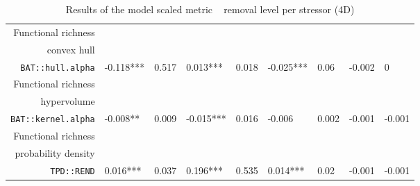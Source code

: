 \begin{table}[ht]
\begin{tabular}{rllllllll}
  Functional richness\\convex hull\\\texttt{BAT::hull.alpha} & -0.118*** & 0.517 & 0.013*** & 0.018 & -0.025*** & 0.06 & -0.002 & 0 \\ 
  Functional richness\\hypervolume\\\texttt{BAT::kernel.alpha} & -0.008** & 0.009 & -0.015*** & 0.016 & -0.006 & 0.002 & -0.001 & -0.001 \\ 
  Functional richness\\probability density\\\texttt{TPD::REND} & 0.016*** & 0.037 & 0.196*** & 0.535 & 0.014*** & 0.02 & -0.001 & -0.001 \\ 
   \hline
\end{tabular}
\caption{Results of the model scaled metric ~ removal level per stressor (4D)} 
\end{table}
